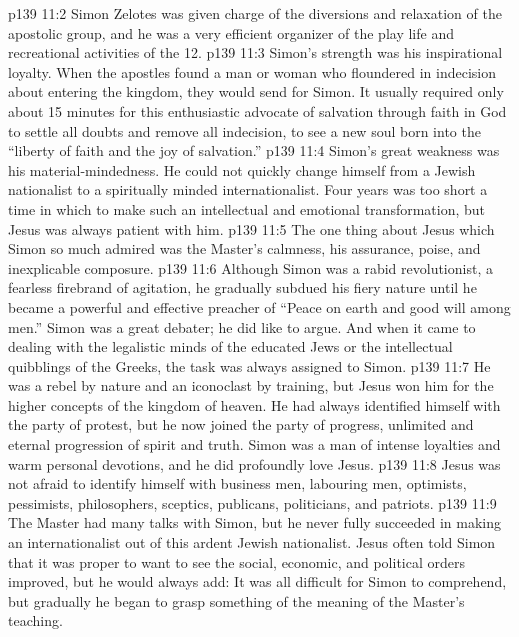 \vs p139 11:2 \pc Simon Zelotes was given charge of the diversions and relaxation of the apostolic group, and he was a very efficient organizer of the play life and recreational activities of the 12.
\vs p139 11:3 Simon’s strength was his inspirational loyalty. When the apostles found a man or woman who floundered in indecision about entering the kingdom, they would send for Simon. It usually required only about 15 minutes for this enthusiastic advocate of salvation through faith in God to settle all doubts and remove all indecision, to see a new soul born into the “liberty of faith and the joy of salvation.”
\vs p139 11:4 Simon’s great weakness was his material\hyp{}mindedness. He could not quickly change himself from a Jewish nationalist to a spiritually minded internationalist. Four years was too short a time in which to make such an intellectual and emotional transformation, but Jesus was always patient with him.
\vs p139 11:5 \pc The one thing about Jesus which Simon so much admired was the Master’s calmness, his assurance, poise, and inexplicable composure.
\vs p139 11:6 \pc Although Simon was a rabid revolutionist, a fearless firebrand of agitation, he gradually subdued his fiery nature until he became a powerful and effective preacher of “Peace on earth and good will among men.” Simon was a great debater; he did like to argue. And when it came to dealing with the legalistic minds of the educated Jews or the intellectual quibblings of the Greeks, the task was always assigned to Simon.
\vs p139 11:7 He was a rebel by nature and an iconoclast by training, but Jesus won him for the higher concepts of the kingdom of heaven. He had always identified himself with the party of protest, but he now joined the party of progress, unlimited and eternal progression of spirit and truth. Simon was a man of intense loyalties and warm personal devotions, and he did profoundly love Jesus.
\vs p139 11:8 \pc Jesus was not afraid to identify himself with business men, labouring men, optimists, pessimists, philosophers, sceptics, publicans, politicians, and patriots.
\vs p139 11:9 \pc The Master had many talks with Simon, but he never fully succeeded in making an internationalist out of this ardent Jewish nationalist. Jesus often told Simon that it was proper to want to see the social, economic, and political orders improved, but he would always add:  It was all difficult for Simon to comprehend, but gradually he began to grasp something of the meaning of the Master’s teaching.
